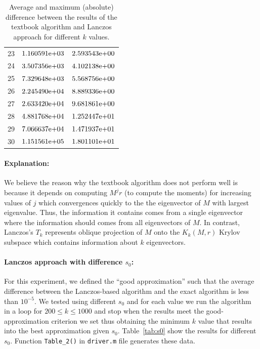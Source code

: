 \begin{table}[!tbh]
\begin{tabular}{ ||p{1.5cm}| p{4cm}| p{4cm}||}
	23  & ${1.160591}\mathrm{e}{+03}$   & ${2.593543}\mathrm{e}{+00}$   \\
	24  & ${3.507356}\mathrm{e}{+03}$   & ${4.102138}\mathrm{e}{+00}$   \\
	25  & ${7.329648}\mathrm{e}{+03}$   & ${5.568756}\mathrm{e}{+00}$   \\
	26  & ${2.245490}\mathrm{e}{+04}$   & ${8.889336}\mathrm{e}{+00}$   \\
	27  & ${2.633420}\mathrm{e}{+04}$   & ${9.681861}\mathrm{e}{+00}$   \\
	28  & ${4.881768}\mathrm{e}{+04}$   & ${1.252447}\mathrm{e}{+01}$   \\
	29  & ${7.066637}\mathrm{e}{+04}$   & ${1.471937}\mathrm{e}{+01}$   \\
	30  & ${1.151561}\mathrm{e}{+05}$   & ${1.801101}\mathrm{e}{+01}$   \\
\hline
\end{tabular} 
\caption{Average and maximum (absolute) difference between the results of the textbook algorithm and Lanczos approach for different $k$ values.}
   \label{tab:comp}
\end{table}

\paragraph{Explanation:} We believe the reason why the textbook algorithm does not perform well is because it depends on computing $M^{j}r$ (to compute the moments) for increasing values of $j$ which convergences quickly to the the eigenvector of $M$ with largest eigenvalue. Thus, the information it contains comes from a single eigenvector where the information should comes from all eigenvectors of $M$. In contrast, Lanczos's $T_{k}$ represents oblique projection of $M$ onto the $K_{k}(M,r)$ Krylov subspace which contains information about $k$ eigenvectors. 

\paragraph{Lanczos approach with difference $s_{0}$:} For this experiment, we defined the ``good approximation'' such that the average difference between the Lanczos-based algorithm and the exact algorithm is less than  $10^{-5}$. We tested using different $s_{0}$ and for each value we run the algorithm in a loop for $200\leq k \leq 1000$ and stop when the results meet the good-approximation criterion we set thus obtaining the minimum $k$ value that results into the best approximation given $s_{0}$. Table~\ref{tab:s0} show the results for different $s_{0}$. Function \texttt{Table\_2()} in \texttt{driver.m} file generates these data.

